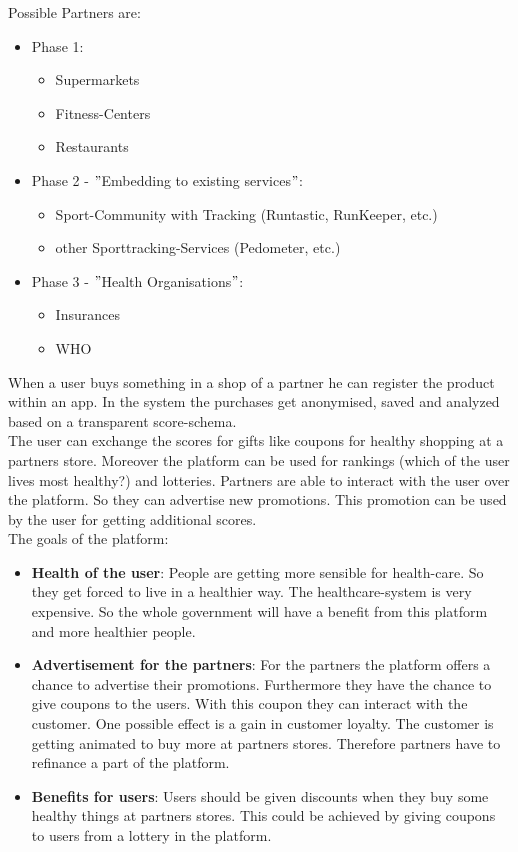 \documentclass[a4paper,11pt]{article}
\begin{document}
Possible Partners are:
\begin{itemize}
	\item Phase 1:
		\begin{itemize}
			\item Supermarkets
			\item Fitness-Centers
			\item Restaurants
		\end{itemize}
	\item Phase 2 - $"$Embedding to existing services$"$:
		\begin{itemize}
			\item Sport-Community with Tracking (Runtastic, RunKeeper, etc.)
			\item other Sporttracking-Services (Pedometer, etc.)
		\end{itemize}
	\item Phase 3 - $"$Health Organisations$"$:
		\begin{itemize}
			\item Insurances 
			\item WHO
		\end{itemize}
\end{itemize}

When a user buys something in a shop of a partner he can register the product within an app. In the system the purchases get anonymised, saved and analyzed based on a transparent score-schema. \\

The user can exchange the scores for gifts like coupons for healthy shopping at a partners store. Moreover the platform can be used for rankings (which of the user lives most healthy?) and lotteries. Partners are able to interact with the user over the platform. So they can advertise new promotions. This promotion can be used by the user for getting additional scores. \\


The goals of the platform:
\begin{itemize}
\item \textbf{Health of the user}: People are getting more sensible for health-care. So they get forced to live in a healthier way. The healthcare-system is very expensive. So the whole government will have a benefit from this platform and more healthier people. 
\item \textbf{Advertisement for the partners}: For the partners the platform offers a chance to advertise their promotions. Furthermore they have the chance to give coupons to the users. With this coupon they can interact with the customer. One possible effect is a gain in customer loyalty. The customer is getting animated to buy more at partners stores. Therefore partners have to refinance a part of the platform.
\item \textbf{Benefits for users}: Users should be given discounts when they buy some healthy things at partners stores. This could be achieved by giving coupons to users from a lottery in the platform. 

\end{itemize}
\end{document}
